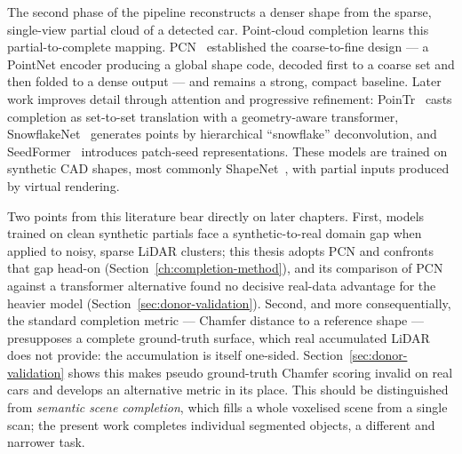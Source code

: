 The second phase of the pipeline reconstructs a denser shape from the sparse, single-view
partial cloud of a detected car. Point-cloud completion learns this partial-to-complete
mapping. PCN~\cite{yuan2019pcnpointcompletionnetwork} established the coarse-to-fine
design --- a PointNet encoder producing a global shape code, decoded first to a coarse
set and then folded to a dense output --- and remains a strong, compact baseline. Later
work improves detail through attention and progressive refinement:
PoinTr~\cite{yu2021pointr} casts completion as set-to-set translation with a
geometry-aware transformer, SnowflakeNet~\cite{xiang2021snowflakenet} generates points
by hierarchical ``snowflake'' deconvolution, and SeedFormer~\cite{zhou2022seedformer}
introduces patch-seed representations. These models are trained on synthetic CAD shapes,
most commonly ShapeNet~\cite{chang2015shapenetinformationrich3dmodel}, with partial
inputs produced by virtual rendering.

Two points from this literature bear directly on later chapters. First, models trained
on clean synthetic partials face a synthetic-to-real domain gap when applied to noisy,
sparse LiDAR clusters; this thesis adopts PCN and confronts that gap head-on
(Section~\ref{ch:completion-method}), and its comparison of PCN against a transformer alternative found no
decisive real-data advantage for the heavier model (Section~\ref{sec:donor-validation}). Second, and more
consequentially, the standard completion metric --- Chamfer distance to a reference
shape --- presupposes a complete ground-truth surface, which real accumulated LiDAR does
not provide: the accumulation is itself one-sided. Section~\ref{sec:donor-validation} shows this makes pseudo
ground-truth Chamfer scoring invalid on real cars and develops an alternative metric in
its place. This should be distinguished from \emph{semantic scene completion}, which
fills a whole voxelised scene from a single scan; the present work completes individual
segmented objects, a different and narrower task.

